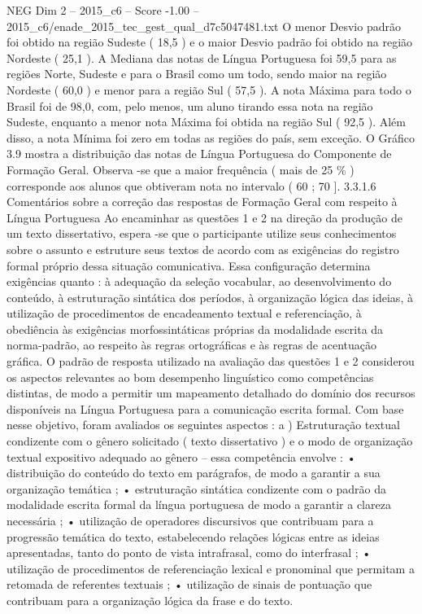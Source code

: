 \begin{textsample}{NEG Dim 2 – 2015\_c6 – Score -1.00 – 2015\_c6/enade\_2015\_tec\_gest\_qual\_d7c5047481.txt}
O menor Desvio padrão foi obtido na região Sudeste ( 18,5 ) e o maior Desvio padrão foi obtido na região Nordeste ( 25,1 ).
A Mediana das notas de Língua Portuguesa foi 59,5 para as regiões Norte, Sudeste e para o Brasil como um todo, sendo maior na região Nordeste ( 60,0 ) e menor para a região Sul ( 57,5 ).
A nota Máxima para todo o Brasil foi de 98,0, com, pelo menos, um aluno tirando essa nota na região Sudeste, enquanto a menor nota Máxima foi obtida na região Sul ( 92,5 ).
Além disso, a nota Mínima foi zero em todas as regiões do país, sem exceção.
O Gráfico 3.9 mostra a distribuição das notas de Língua Portuguesa do Componente de Formação Geral.
Observa -se que a maior frequência ( mais de 25 \% ) corresponde aos alunos que obtiveram nota no intervalo ( 60 ; 70 ]. 3.3.1.6 Comentários sobre a correção das respostas de Formação Geral com respeito à Língua Portuguesa Ao encaminhar as questões 1 e 2 na direção da produção de um texto dissertativo, espera -se que o participante utilize seus conhecimentos sobre o assunto e estruture seus textos de acordo com as exigências do registro formal próprio dessa situação comunicativa.
Essa configuração determina exigências quanto : à adequação da seleção vocabular, ao desenvolvimento do conteúdo, à estruturação sintática dos períodos, à organização lógica das ideias, à utilização de procedimentos de encadeamento textual e referenciação, à obediência às exigências morfossintáticas próprias da modalidade escrita da norma-padrão, ao respeito às regras ortográficas e às regras de acentuação gráfica.
O padrão de resposta utilizado na avaliação das questões 1 e 2 considerou os aspectos relevantes ao bom desempenho linguístico como competências distintas, de modo a permitir um mapeamento detalhado do domínio dos recursos disponíveis na Língua Portuguesa para a comunicação escrita formal.
Com base nesse objetivo, foram avaliados os seguintes aspectos : a ) Estruturação textual condizente com o gênero solicitado ( texto dissertativo ) e o modo de organização textual expositivo adequado ao gênero – essa competência envolve : • distribuição do conteúdo do texto em parágrafos, de modo a garantir a sua organização temática ; • estruturação sintática condizente com o padrão da modalidade escrita formal da língua portuguesa de modo a garantir a clareza necessária ; • utilização de operadores discursivos que contribuam para a progressão temática do texto, estabelecendo relações lógicas entre as ideias apresentadas, tanto do ponto de vista intrafrasal, como do interfrasal ; • utilização de procedimentos de referenciação lexical e pronominal que permitam a retomada de referentes textuais ; • utilização de sinais de pontuação que contribuam para a organização lógica da frase e do texto.

\end{textsample}
